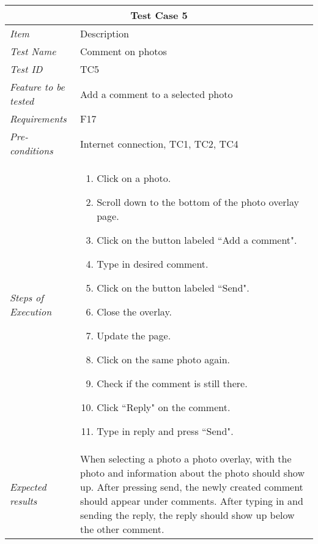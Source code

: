 %
\begin{minipage}{\linewidth}
\setlength{\tabcolsep}{15pt}
\centering
{}
\begin{tabular}{ |l|p{70mm}| }
	\hline
	\multicolumn{2}{|c|}{\cellcolor{gray!25} \textbf{Test Case 5}} \\
	\hline
	\it{\cellcolor{gray!25}Item} & {\cellcolor{gray!25} Description } \\
	\hline
	\it{\cellcolor{gray!25}Test Name } & Comment on photos \\ \hline
	\it{\cellcolor{gray!25}Test ID} & TC5 \\ \hline
	\it{\cellcolor{gray!25}Feature to be tested} & Add a comment to a selected photo \\ \hline
	\it{\cellcolor{gray!25}Requirements} & F17  \\ \hline
	\it{\cellcolor{gray!25}Pre-conditions} & Internet connection, TC1, TC2, TC4 \\ \hline
	\it{\cellcolor{gray!25}Steps of Execution} & \begin{enumerate}
	                                       \item Click on a photo.
	                                       \item Scroll down to the bottom of the photo overlay page.
	                                       \item Click on the button labeled ``Add a comment".
	                                       \item Type in desired comment.
	                                       \item Click on the button labeled ``Send".
	                                       \item Close the overlay.
	                                       \item Update the page.
	                                       \item Click on the same photo again.
	                                       \item Check if the comment is still there.
	                                       \item Click ``Reply" on the comment.
	                                       \item Type in reply and press ``Send".
	                                     \end{enumerate} \\ \hline
	\it{\cellcolor{gray!25}Expected results} & When selecting a photo a photo overlay, with the photo and information about the photo should show up. After pressing send, the newly created comment should appear under comments. After typing in and sending the reply, the reply should show up below the other comment. \\
	\hline
\end{tabular}
\medskip
\end{minipage}
